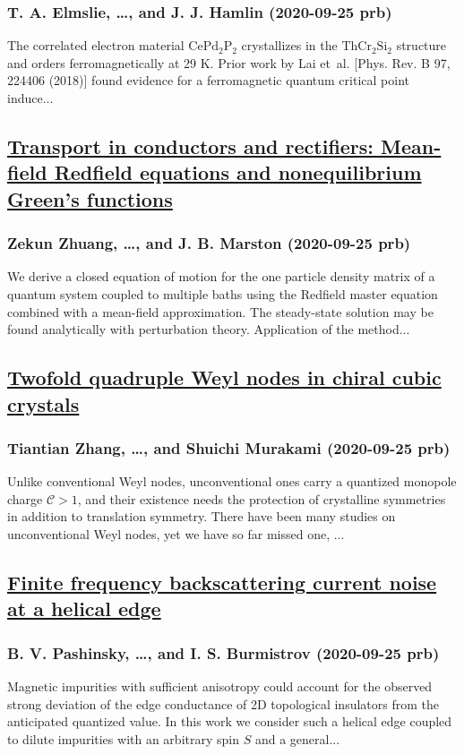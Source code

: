 \subsubsection*{T. A. Elmslie, \dots, and J. J. Hamlin (2020-09-25 prb)}
The correlated electron material ${\mathrm{CePd}}_{2}{\mathrm{P}}_{2}$ crystallizes in the ${\mathrm{ThCr}}_{2}{\mathrm{Si}}_{2}$ structure and orders ferromagnetically at 29 K. Prior work by Lai et al. [Phys. Rev. B 97, 224406 (2018)] found evidence for a ferromagnetic quantum critical point induce...
\subsection*{\href{http://link.aps.org/doi/10.1103/PhysRevB.102.125147}{Transport in conductors and rectifiers: Mean-field Redfield equations and nonequilibrium Green's functions}}
\subsubsection*{Zekun Zhuang, \dots, and J. B. Marston (2020-09-25 prb)}
We derive a closed equation of motion for the one particle density matrix of a quantum system coupled to multiple baths using the Redfield master equation combined with a mean-field approximation. The steady-state solution may be found analytically with perturbation theory. Application of the method...
\subsection*{\href{http://link.aps.org/doi/10.1103/PhysRevB.102.125148}{Twofold quadruple Weyl nodes in chiral cubic crystals}}
\subsubsection*{Tiantian Zhang, \dots, and Shuichi Murakami (2020-09-25 prb)}
Unlike conventional Weyl nodes, unconventional ones carry a quantized monopole charge $\mathcal{C}>1$, and their existence needs the protection of crystalline symmetries in addition to translation symmetry. There have been many studies on unconventional Weyl nodes, yet we have so far missed one, ...
\subsection*{\href{http://link.aps.org/doi/10.1103/PhysRevB.102.125309}{Finite frequency backscattering current noise at a helical edge}}
\subsubsection*{B. V. Pashinsky, \dots, and I. S. Burmistrov (2020-09-25 prb)}
Magnetic impurities with sufficient anisotropy could account for the observed strong deviation of the edge conductance of 2D topological insulators from the anticipated quantized value. In this work we consider such a helical edge coupled to dilute impurities with an arbitrary spin $S$ and a general...
